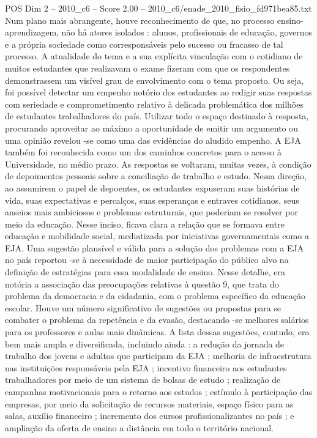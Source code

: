 \begin{textsample}{POS Dim 2 – 2010\_c6 – Score 2.00 – 2010\_c6/enade\_2010\_fisio\_fd971bea85.txt}
Num plano mais abrangente, houve reconhecimento de que, no processo ensino-aprendizagem, não há atores isolados : alunos, profissionais de educação, governos e a própria sociedade como corresponsáveis pelo sucesso ou fracasso de tal processo.
A atualidade do tema e a sua explícita vinculação com o cotidiano de muitos estudantes que realizavam o exame fizeram com que os respondentes demonstrassem um visível grau de envolvimento com o tema proposto.
Ou seja, foi possível detectar um empenho notório dos estudantes ao redigir suas respostas com seriedade e comprometimento relativo à delicada problemática dos milhões de estudantes trabalhadores do país.
Utilizar todo o espaço destinado à resposta, procurando aproveitar ao máximo a oportunidade de emitir um argumento ou uma opinião revelou -se como uma das evidências do aludido empenho.
A EJA também foi reconhecida como um dos caminhos concretos para o acesso à Universidade, no médio prazo.
As respostas se voltaram, muitas vezes, à condição de depoimentos pessoais sobre a conciliação de trabalho e estudo.
Nessa direção, ao assumirem o papel de depoentes, os estudantes expuseram suas histórias de vida, suas expectativas e percalços, suas esperanças e entraves cotidianos, seus anseios mais ambiciosos e problemas estruturais, que poderiam se resolver por meio da educação.
Nesse inciso, ficava clara a relação que se formava entre educação e mobilidade social, mediatizada por iniciativas governamentais como a EJA.
Uma sugestão plausível e válida para a solução dos problemas com a EJA no país reportou -se à necessidade de maior participação do público alvo na definição de estratégias para essa modalidade de ensino.
Nesse detalhe, era notória a associação das preocupações relativas à questão 9, que trata do problema da democracia e da cidadania, com o problema específico da educação escolar.
Houve um número significativo de sugestões ou propostas para se combater o problema da repetência e da evasão, destacando -se melhores salários para os professores e aulas mais dinâmicas.
A lista dessas sugestões, contudo, era bem mais ampla e diversificada, incluindo ainda : a redução da jornada de trabalho dos jovens e adultos que participam da EJA ; melhoria de infraestrutura nas instituições responsáveis pela EJA ; incentivo financeiro aos estudantes trabalhadores por meio de um sistema de bolsas de estudo ; realização de campanhas motivacionais para o retorno aos estudos ; estímulo à participação das empresas, por meio da solicitação de recursos materiais, espaço físico para as salas, auxílio financeiro ; incremento dos cursos profissionalizantes no país ; e ampliação da oferta de ensino a distância em todo o território nacional.

\end{textsample}

